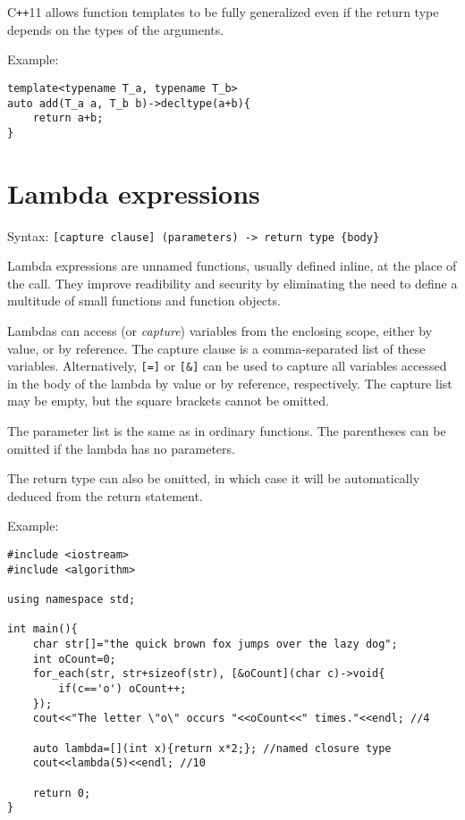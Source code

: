 \documentclass[12pt,a4paper]{article}
\begin{document}
C\texttt{++}11 allows function templates to be fully generalized even if the return type depends on the types of the arguments.

Example:
\vspace{10pt}
\lstset{style=CPP_CODE}
\begin{lstlisting}
template<typename T_a, typename T_b>
auto add(T_a a, T_b b)->decltype(a+b){
    return a+b;
}
\end{lstlisting}

\clearpage


\section{Lambda expressions}

Syntax: \lstinline[language=none]|[capture clause] (parameters) -> return type {body}|

Lambda expressions are unnamed functions, usually defined inline, at the place of the call. They improve readibility and security by eliminating the need to define a multitude of small functions and function objects.

Lambdas can access (or \emph{capture}) variables from the enclosing scope, either by value, or by reference. The capture clause is a comma-separated list of these variables. Alternatively, \lstinline[language=none]|[=]| or \lstinline[language=none]|[&]| can be used to capture all variables accessed in the body of the lambda by value or by reference, respectively. The capture list may be empty, but the square brackets cannot be omitted.

The parameter list is the same as in ordinary functions. The parentheses can be omitted if the lambda has no parameters.

The return type can also be omitted, in which case it will be automatically deduced from the return statement.

Example:
\vspace{10pt}
\lstset{style=CPP_CODE}
\begin{lstlisting}
#include <iostream>
#include <algorithm>

using namespace std;
	
int main(){
    char str[]="the quick brown fox jumps over the lazy dog";
    int oCount=0;
    for_each(str, str+sizeof(str), [&oCount](char c)->void{
        if(c=='o') oCount++;
    });
    cout<<"The letter \"o\" occurs "<<oCount<<" times."<<endl; //4
    
    auto lambda=[](int x){return x*2;}; //named closure type
    cout<<lambda(5)<<endl; //10
    
    return 0;
}
\end{lstlisting}
\end{document}
